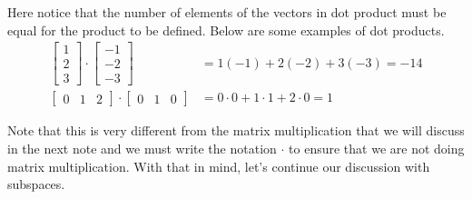 \documentclass[../main.tex]{subfiles}
\begin{document}
Here notice that the number of elements of the vectors in dot product
must be equal for the product to be defined. Below are some examples
of dot products.
\begin{align*}
\begin{bmatrix}
    1 \\
    2 \\
    3
\end{bmatrix}
\cdot
\begin{bmatrix}
    -1 \\
    -2 \\
    -3
\end{bmatrix}
&= 1(-1) + 2(-2) + 3(-3)
= -14 \\
\begin{bmatrix}
    0 & 1 & 2
\end{bmatrix}
\cdot
\begin{bmatrix}
    0 & 1 & 0
\end{bmatrix}
&= 0 \cdot 0 + 1 \cdot 1 + 2 \cdot 0
= 1
\end{align*}

Note that this is very different from the matrix multiplication
that we will discuss in the next note and we must write the
notation $\cdot$ to ensure that we are not doing matrix
multiplication. With that in mind, let's continue our discussion
with subspaces.
\end{document}
